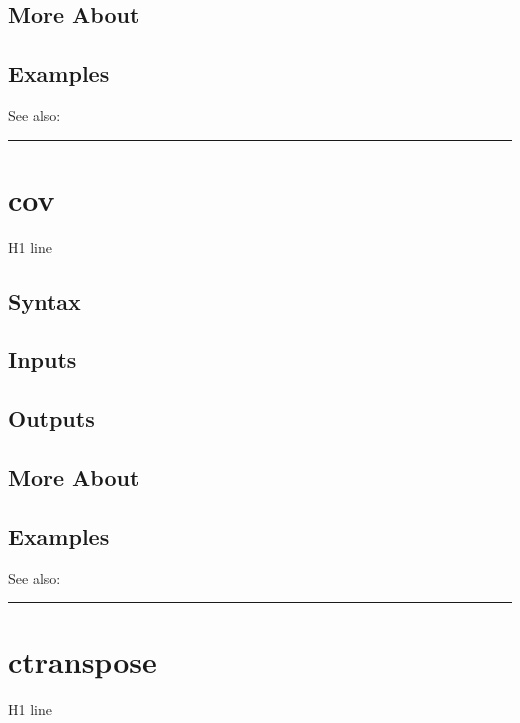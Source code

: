 \documentclass[letterpaper,10pt,english]{sphinxmanual}
\begin{document}
\subsection{More About}
\label{classes/time_series/@ts/ts:id147}

\subsection{Examples}
\label{classes/time_series/@ts/ts:id148}
See also:


\bigskip\hrule{}\bigskip



\section{cov}
\label{classes/time_series/@ts/ts:id149}\label{classes/time_series/@ts/ts:cov}
H1 line


\subsection{Syntax}
\label{classes/time_series/@ts/ts:id150}

\subsection{Inputs}
\label{classes/time_series/@ts/ts:id151}

\subsection{Outputs}
\label{classes/time_series/@ts/ts:id152}

\subsection{More About}
\label{classes/time_series/@ts/ts:id153}

\subsection{Examples}
\label{classes/time_series/@ts/ts:id154}
See also:


\bigskip\hrule{}\bigskip



\section{ctranspose}
\label{classes/time_series/@ts/ts:id155}\label{classes/time_series/@ts/ts:ctranspose}
H1 line
\end{document}
